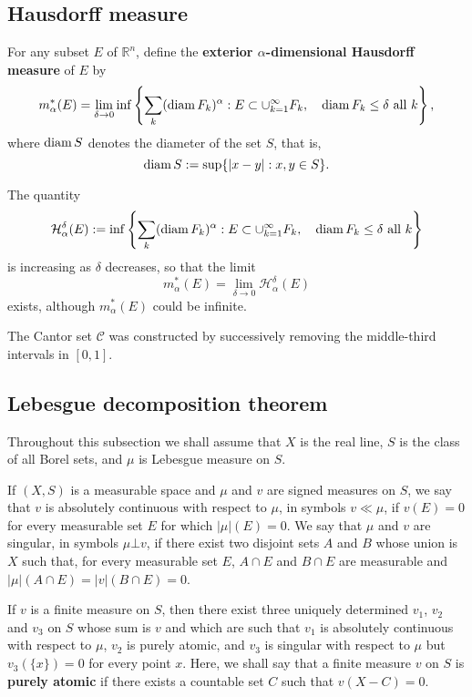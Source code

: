 \subsection{Hausdorff measure}

\begin{definition}
  For any subset $E$ of $\mathbb R^n$, 
  define the \textbf{exterior $\alpha$-dimensional Hausdorff measure} of $E$ by 
  \[
  m^*_\alpha(E) = \lim_{\delta\to0}\inf\left\{\sum_k(\operatorname*{diam} F_k)^\alpha : E\subset\cup_{k=1}^\infty F_k,
  \quad \operatorname*{diam} F_k \leq \delta \text{ all } k\right\},
  \]
  where $\operatorname*{diam} S$ denotes the diameter of the set $S$, that is, 
  \[
  \operatorname*{diam} S := \sup\{|x-y|: x,y\in S\}.
  \]
\end{definition}

\begin{remark}
  The quantity 
  \[
  \mathcal{H}_\alpha^\delta(E) :=  \inf\left\{\sum_k(\operatorname*{diam} F_k)^\alpha : E\subset\cup_{k=1}^\infty F_k,
  \quad \operatorname*{diam} F_k \leq \delta \text{ all } k\right\}
  \]
  is increasing as $\delta$ decreases, so that the limit 
  \[
  m_\alpha^*(E) = \lim_{\delta\to0}\mathcal H_\alpha^\delta(E)
  \]
  exists,
  although $m_\alpha^*(E)$ could be infinite.
\end{remark}

The Cantor set $\mathcal C$ was constructed by successively removing the middle-third intervals in $[0,1]$.

\subsection{Lebesgue decomposition theorem}



Throughout this subsection we shall assume that $X$ is the real line, 
$S$ is the class of all Borel sets,
and $\mu$ is Lebesgue measure on $S$.

If $(X, S)$ is a measurable space and $\mu$ and $v$ are signed measures on $S$, 
we say that $v$ is absolutely continuous with respect to $\mu$,
in symbols $v \ll \mu$, if $v(E) = 0$ for every measurable set $E$ for which $|\mu|(E) = 0$.
We say that $\mu$ and $v$ are singular, in symbols $\mu \bot v$,
if there exist two disjoint sets $A$ and $B$ whose union is $X$ such that,
for every measurable set $E$, $A\cap E$ and $B\cap E$ are measurable and 
$|\mu|(A\cap E) = |v|(B\cap E) = 0$.


\begin{theorem}
  \label{thm: Lebesgue decomposition theorem}
  If $v$ is a finite measure on $S$, 
  then there exist three uniquely determined $v_1$, $v_2$ and $v_3$ on $S$
  whose sum is $v$ and which are such that $v_1$ is absolutely continuous with respect to $\mu$, 
  $v_2$ is purely atomic, 
  and $v_3$ is singular with respect to $\mu$ but $v_3(\{x\}) = 0$ for every point $x$.
  Here, we shall say that a finite measure $v$ on $S$ is \textbf{purely atomic} 
  if there exists a countable set $C$ such that $v(X-C) = 0$.
\end{theorem}

